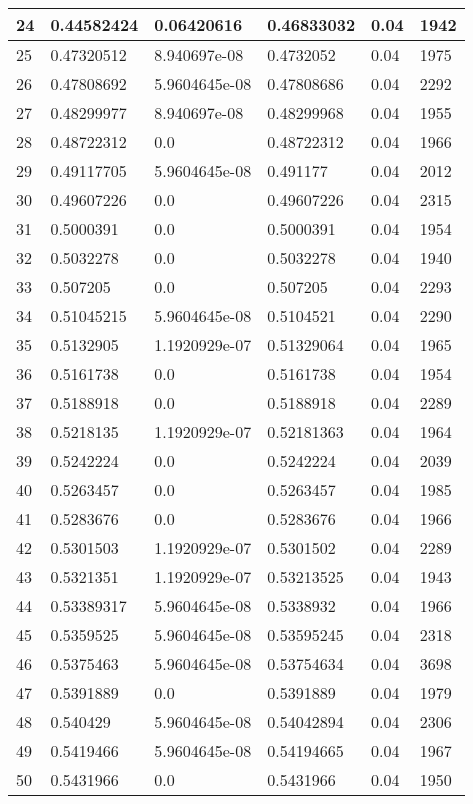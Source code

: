 \begin{longtable}{|l|l|l|l|l|l|}
24 & 0.44582424 & 0.06420616 & 0.46833032 & 0.04 & 1942 \\ \hline 
25 & 0.47320512 & 8.940697e-08 & 0.4732052 & 0.04 & 1975 \\ \hline 
26 & 0.47808692 & 5.9604645e-08 & 0.47808686 & 0.04 & 2292 \\ \hline 
27 & 0.48299977 & 8.940697e-08 & 0.48299968 & 0.04 & 1955 \\ \hline 
28 & 0.48722312 & 0.0 & 0.48722312 & 0.04 & 1966 \\ \hline 
29 & 0.49117705 & 5.9604645e-08 & 0.491177 & 0.04 & 2012 \\ \hline 
30 & 0.49607226 & 0.0 & 0.49607226 & 0.04 & 2315 \\ \hline 
31 & 0.5000391 & 0.0 & 0.5000391 & 0.04 & 1954 \\ \hline 
32 & 0.5032278 & 0.0 & 0.5032278 & 0.04 & 1940 \\ \hline 
33 & 0.507205 & 0.0 & 0.507205 & 0.04 & 2293 \\ \hline 
34 & 0.51045215 & 5.9604645e-08 & 0.5104521 & 0.04 & 2290 \\ \hline 
35 & 0.5132905 & 1.1920929e-07 & 0.51329064 & 0.04 & 1965 \\ \hline 
36 & 0.5161738 & 0.0 & 0.5161738 & 0.04 & 1954 \\ \hline 
37 & 0.5188918 & 0.0 & 0.5188918 & 0.04 & 2289 \\ \hline 
38 & 0.5218135 & 1.1920929e-07 & 0.52181363 & 0.04 & 1964 \\ \hline 
39 & 0.5242224 & 0.0 & 0.5242224 & 0.04 & 2039 \\ \hline 
40 & 0.5263457 & 0.0 & 0.5263457 & 0.04 & 1985 \\ \hline 
41 & 0.5283676 & 0.0 & 0.5283676 & 0.04 & 1966 \\ \hline 
42 & 0.5301503 & 1.1920929e-07 & 0.5301502 & 0.04 & 2289 \\ \hline 
43 & 0.5321351 & 1.1920929e-07 & 0.53213525 & 0.04 & 1943 \\ \hline 
44 & 0.53389317 & 5.9604645e-08 & 0.5338932 & 0.04 & 1966 \\ \hline 
45 & 0.5359525 & 5.9604645e-08 & 0.53595245 & 0.04 & 2318 \\ \hline 
46 & 0.5375463 & 5.9604645e-08 & 0.53754634 & 0.04 & 3698 \\ \hline 
47 & 0.5391889 & 0.0 & 0.5391889 & 0.04 & 1979 \\ \hline 
48 & 0.540429 & 5.9604645e-08 & 0.54042894 & 0.04 & 2306 \\ \hline 
49 & 0.5419466 & 5.9604645e-08 & 0.54194665 & 0.04 & 1967 \\ \hline 
50 & 0.5431966 & 0.0 & 0.5431966 & 0.04 & 1950 \\ \hline 
\end{longtable}